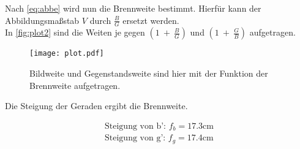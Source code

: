Nach \autoref{eq:abbe} wird nun die Brennweite bestimmt.
Hierfür kann der Abbildungsmaßstab $V$ durch $\frac{B}{G}$ ersetzt werden.\\
In \autoref{fig:plot2} sind die Weiten je gegen $(1\ +\ \frac{B}{G})$ und $(1\ +\ \frac{G}{B})$ aufgetragen.

\begin{figure}[htbp]
  \centering
  \texttt{[image: plot.pdf]}
  \caption{Bildweite und Gegenstandsweite sind hier mit der Funktion der Brennweite aufgetragen.}
  \label{fig:plot2}
\end{figure}
\newpage
Die Steigung der Geraden ergibt die Brennweite.

\begin{align*}
  \text{Steigung von b': } f_b=17.3\si{\centi\metre}\\
  \text{Steigung von g': } f_g=17.4\si{\centi\metre}
\end{align*}